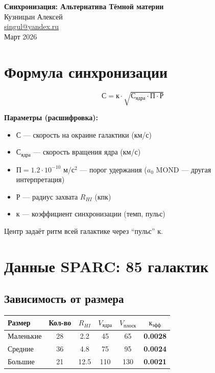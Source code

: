 \documentclass[12pt]{article}
\begin{document}
\begin{center}
\Large\textbf{Синхронизация: Альтернатива Тёмной материи}\\[0.3cm]
\normalsize Кузницын Алексей\\
\small \href{mailto:singul@yandex.ru}{singul@yandex.ru}\\
Март 2026
\end{center}
\vspace{0.3cm}

\section{Формула синхронизации}
\vspace{-0.2cm}
\[ \text{С} = \text{к} \cdot \sqrt{\text{С}_{\text{ядра}} \cdot \text{П} \cdot \text{Р}} \]
\vspace{-0.3cm}

\textbf{Параметры (расшифровка):}
\begin{itemize}\setlength\itemsep{-0.1cm}
\item $\text{С}$ — скорость на окраине галактики (км/с)
\item $\text{С}_{\text{ядра}}$ — скорость вращения ядра (км/с)  
\item $\text{П} = 1.2 \cdot 10^{-10}$ м/с$^2$ — порог удержания ($a_0$ MOND — другая интерпретация)
\item $\text{Р}$ — радиус захвата $R_{HI}$ (кпк)
\item $\text{к}$ — коэффициент синхронизации (темп, пульс)
\end{itemize}
\vspace{-0.2cm}

Центр задаёт ритм всей галактике через ``пульс'' $\text{к}$.

\section{Данные SPARC: 85 галактик}
\vspace{-0.2cm}

\subsection{Зависимость от размера}
\vspace{-0.2cm}
\begin{table}[h]
\centering
\begin{tabular}{lccccc}
\toprule
Размер & Кол-во & $R_{HI}$ & $V_{\text{ядра}}$ & $V_{\text{плоск}}$ & $\text{к}_{\text{эфф}}$ \\
\midrule
Маленькие & 28 & 2.2 & 45 & 65 & \textbf{0.0028} \\
Средние & 36 & 4.8 & 75 & 95 & \textbf{0.0024} \\
Большие & 21 & 12.5 & 110 & 130 & \textbf{0.0021} \\
\bottomrule
\end{tabular}
\end{table}
\vspace{-0.3cm}
\end{document}
